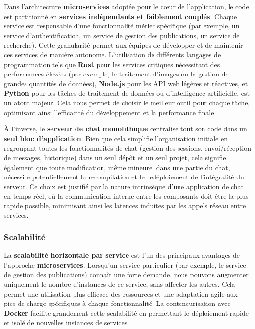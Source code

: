 \documentclass[12pt]{rapportPfe}
\begin{document}
Dans l'architecture \textbf{microservices} adoptée pour le cœur de l'application, le code est partitionné en \textbf{services indépendants et faiblement couplés}. Chaque service est responsable d'une fonctionnalité métier spécifique (par exemple, un service d'authentification, un service de gestion des publications, un service de recherche). Cette granularité permet aux équipes de développer et de maintenir ces services de manière autonome. L'utilisation de différents langages de programmation tels que \textbf{Rust} pour les services critiques nécessitant des performances élevées (par exemple, le traitement d'images ou la gestion de grandes quantités de données), \textbf{Node.js} pour les API web légères et réactives, et \textbf{Python} pour les tâches de traitement de données ou d'intelligence artificielle, est un atout majeur. Cela nous permet de choisir le meilleur outil pour chaque tâche, optimisant ainsi l'efficacité du développement et la performance finale.

À l'inverse, le \textbf{serveur de chat monolithique} centralise tout son code dans un \textbf{seul bloc d'application}. Bien que cela simplifie l'organisation initiale en regroupant toutes les fonctionnalités de chat (gestion des sessions, envoi/réception de messages, historique) dans un seul dépôt et un seul projet, cela signifie également que toute modification, même mineure, dans une partie du chat, nécessite potentiellement la recompilation et le redéploiement de l'intégralité du serveur. Ce choix est justifié par la nature intrinsèque d'une application de chat en temps réel, où la communication interne entre les composants doit être la plus rapide possible, minimisant ainsi les latences induites par les appels réseau entre services.

\subsubsection{Scalabilité}

La \textbf{scalabilité horizontale par service} est l'un des principaux avantages de l'approche \textbf{microservices}. Lorsqu'un service particulier (par exemple, le service de gestion des publications) connaît une forte demande, nous pouvons augmenter uniquement le nombre d'instances de ce service, sans affecter les autres. Cela permet une utilisation plus efficace des ressources et une adaptation agile aux pics de charge spécifiques à chaque fonctionnalité. La conteneurisation avec \textbf{Docker} facilite grandement cette scalabilité en permettant le déploiement rapide et isolé de nouvelles instances de services.
\end{document}

